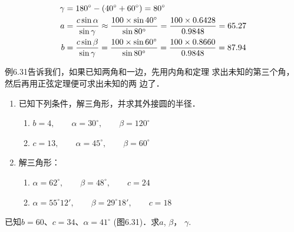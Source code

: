 \begin{figure}[htp]
    \centering
{}
    \caption{}
\end{figure}

\begin{solution}
\[\begin{split}
    \gamma&=180^{\circ}-(40^{\circ}+60^{\circ})=80^{\circ}\\
    a&=\dfrac{c\sin\alpha}{\sin\gamma}\approx \dfrac{100\times \sin 40^{\circ}}{\sin 80^{\circ}}=\dfrac{100\times 0.6428}{0.9848}=65.27\\
    b&=\dfrac{c\sin\beta}{\sin\gamma}=\dfrac{100\times \sin 60^{\circ}}{\sin 80^{\circ}}=\dfrac{100\times 0.8660}{0.9848}=87.94
\end{split}\]
\end{solution}

例6.31告诉我们，如果已知两角和一边，先用内角和定理
求出未知的第三个角，然后再用正弦定理便可求出未知的两
边了．

\begin{ex}
\begin{enumerate}
    \item 已知下列条件，解三角形，并求其外接圆的半径．
\begin{enumerate}
    \item $b=4,\qquad \alpha=30^{\circ} ,\qquad \beta=120^{\circ} $
    \item $c=13,\qquad \alpha=45^{\circ},\qquad \beta=60^{\circ} $
\end{enumerate}
    \item 解三角形：
\begin{enumerate}
    \item $\alpha=62^{\circ} ,\qquad \beta=48^{\circ} ,\qquad c=24$
    \item $\alpha=55^{\circ} 12',\qquad \beta=29^{\circ} 18',\qquad c=18$
\end{enumerate}
\end{enumerate}
\end{ex}


\begin{example}
    已知$b=60$、$c=34$、$\alpha=41^{\circ}$ (图6.31)．求$a$, $\beta$，
$\gamma$.
\end{example}

\begin{figure}[htp]
    \centering
{}
    \caption{}
\end{figure}

